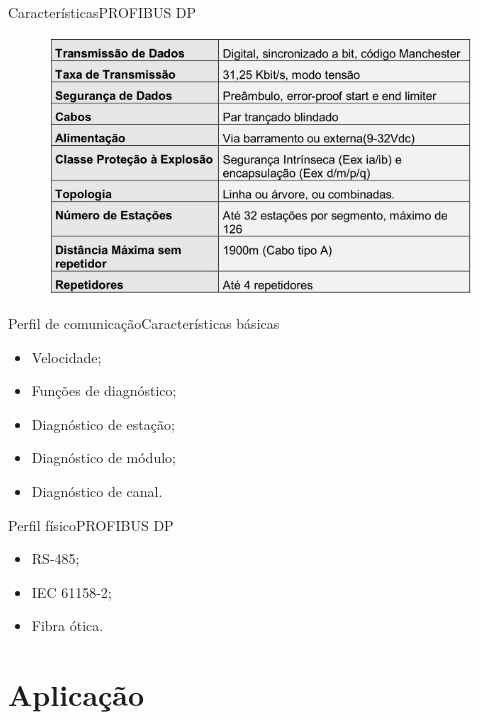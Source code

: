 \documentclass{beamer}
\begin{document}
\begin{frame}{Características}{PROFIBUS DP}
	
	\begin{figure}
	\centering
	\includegraphics[scale=0.6]{figs/caracteristicas}
	\end{figure}

\end{frame}

\begin{frame}{Perfil de comunicação}{Características básicas}
	
	\begin{itemize}
		\item Velocidade;
		\item Funções de diagnóstico;
		\item Diagnóstico de estação;
		\item Diagnóstico de módulo;
		\item Diagnóstico de canal.
	\end{itemize}

\end{frame}

\begin{frame}{Perfil físico}{PROFIBUS DP}
	
	\begin{itemize}
		\item RS-485;
		\item IEC 61158-2;
		\item Fibra ótica.
	\end{itemize}

\end{frame}


\section{Aplicação}
\end{document}

